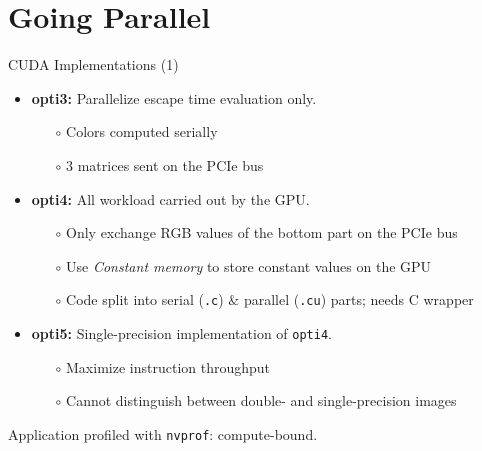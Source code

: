 \documentclass[10pt]{beamer}
\begin{document}

\section{Going Parallel}

\begin{frame}{CUDA Implementations (1)}
	
\begin{itemize}
	\item \textbf{opti3:} Parallelize escape time evaluation only.
		\begin{itemize}
			\item[$\circ$] Colors computed serially
			\item[$\circ$] $3$ matrices sent on the PCIe bus
		\end{itemize}
	\item \textbf{opti4:} All workload carried out by the GPU. 
		\begin{itemize}
			\item[$\circ$] Only exchange RGB values of the bottom part on the PCIe bus
			\item[$\circ$] Use \textit{Constant memory} to store constant values on the GPU
			\item[$\circ$] Code split into serial (\texttt{.c}) $\&$ parallel (\texttt{.cu}) parts; needs C wrapper
		\end{itemize}
	\item \textbf{opti5:} Single-precision implementation of \texttt{opti4}. 
		\begin{itemize}
			\item[$\circ$] Maximize instruction throughput
			\item[$\circ$] Cannot distinguish between double- and single-precision images
		\end{itemize}
\end{itemize}
Application profiled with \texttt{nvprof}: compute-bound.
	
\end{frame}
\end{document}
